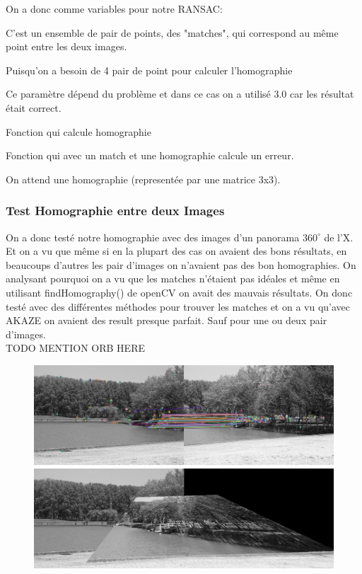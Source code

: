 \documentclass[11pt]{article}
\begin{document}
On a donc comme variables pour notre RANSAC:
\begin{description}[labelindent=16pt,style=multiline,leftmargin=7cm, noitemsep]
	\item[Données:] C’est un ensemble de pair de points, des "matches",  qui correspond au même point entre les deux images.
	\item[Nombre minimum de donnée:] Puisqu’on a besoin de 4 pair de point pour calculer l’homographie
	\item[Error threshold:] Ce paramètre dépend du problème et dans ce cas on a utilisé 3.0 car les résultat était correct. 
	\item[CalculateParametres:] Fonction qui calcule homographie
	\item[CalculateError:] Fonction qui avec un match et une homographie calcule un erreur.
	\item[bestFittingParameters:] On attend une homographie (representée par une matrice 3x3).
\end{description}

\subsubsection{Test Homographie entre deux Images}

On a donc testé notre homographie avec des images d’un panorama $360^{\circ}$ de l’X. Et on a vu que même si en la plupart des cas on avaient des bons résultats, en beaucoups d’autres les pair d’images on n’avaient pas des bon homographies. On analysant pourquoi on a vu que les matches n’étaient pas idéales et même en utilisant findHomography() de openCV on avait des mauvais résultats. On donc testé avec des différentes méthodes pour trouver les matches et on a vu qu’avec AKAZE on avaient des result presque parfait. Sauf pour une ou deux pair d’images. \\

TODO MENTION ORB HERE

\begin{figure}[H]
\centering
\includegraphics[width=.8\textwidth]{../resources/matchers/orb.jpg}
\includegraphics[width=.8\textwidth]{../resources/matchers/orb_pano.jpg}
\end{figure}
\end{document}
